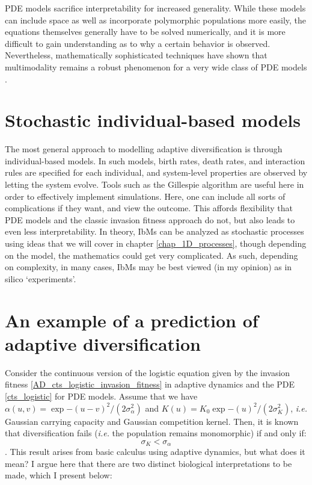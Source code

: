 PDE models sacrifice interpretability for increased generality. While these models can include space as well as incorporate polymorphic populations more easily, the equations themselves generally have to be solved numerically, and it is more difficult to gain understanding as to why a certain behavior is observed. Nevertheless, mathematically sophisticated techniques have shown that multimodality remains a robust phenomenon for a very wide class of PDE models \citep{elmhirst_pod_2008,doebeli_adaptive_2011}.

\section{Stochastic individual-based models}

The most general approach to modelling adaptive diversification is through individual-based models. In such models, birth rates, death rates, and interaction rules are specified for each individual, and system-level properties are observed by letting the system evolve. Tools such as the Gillespie algorithm are useful here in order to effectively implement simulations. Here, one can include all sorts of complications if they want, and view the outcome. This affords flexibility that PDE models and the classic invasion fitness approach do not, but also leads to even less interpretability. In theory, IbMs can be analyzed as stochastic processes using ideas that we will cover in chapter \ref{chap_1D_processes}, though depending on the model, the mathematics could get very complicated. As such, depending on complexity, in many cases, IbMs may be best viewed (in my opinion) as in silico `experiments'.

\section{An example of a prediction of adaptive diversification}

Consider the continuous version of the logistic equation given by the invasion fitness \eqref{AD_cts_logistic_invasion_fitness} in adaptive dynamics and the PDE \eqref{cts_logistic} for PDE models. Assume that we have $\alpha(u,v) = \exp{-(u-v)^2/(2\sigma^{2}_{\alpha})}$ and $K(u) = K_{0}\exp{-(u)^2/(2\sigma^{2}_{K})}$, \emph{i.e.} Gaussian carrying capacity and Gaussian competition kernel. Then, it is known that diversification fails (\emph{i.e.} the population remains monomorphic) if and only if:
\begin{equation}\label{AD_monomorphic_condn}
	\sigma_K<\sigma_{\alpha}
\end{equation}.
This result arises from basic calculus using adaptive dynamics, but what does it mean? I argue here that there are two distinct biological interpretations to be made, which I present below:

